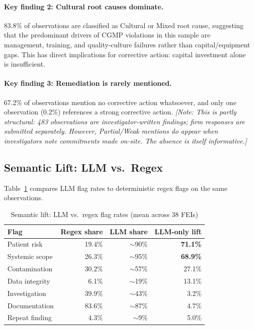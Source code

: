 \documentclass[12pt]{article}
\newcommand{\note}[1]{{\color{blue}\textit{[Note: #1]}}}
\begin{document}
\paragraph{Key finding 2: Cultural root causes dominate.}
83.8\% of observations are classified as Cultural or Mixed root cause,
suggesting that the predominant drivers of CGMP violations in this sample
are management, training, and quality-culture failures rather than
capital/equipment gaps.
This has direct implications for corrective action: capital investment alone
is insufficient.

\paragraph{Key finding 3: Remediation is rarely mentioned.}
67.2\% of observations mention no corrective action whatsoever, and only
one observation (0.2\%) references a strong corrective action.
\note{This is partly structural: 483 observations are investigator-written
findings; firm responses are submitted separately.
However, Partial/Weak mentions do appear when investigators note commitments
made on-site. The absence is itself informative.}

\subsection{Semantic Lift: LLM vs.\ Regex}

Table~\ref{tab:lift} compares LLM flag rates to deterministic regex flags
on the same observations.

\begin{table}[h!]
\centering
\caption{Semantic lift: LLM vs.\ regex flag rates (mean across 38 FEIs)}
\label{tab:lift}
\begin{tabular}{lrrr}
\toprule
\textbf{Flag} & \textbf{Regex share} & \textbf{LLM share}
              & \textbf{LLM-only lift} \\
\midrule
Patient risk   & 19.4\% & $\sim$90\% & \textbf{71.1\%} \\
Systemic scope & 26.3\% & $\sim$95\% & \textbf{68.9\%} \\
Contamination  & 30.2\% & $\sim$57\% & 27.1\% \\
Data integrity &  6.1\% & $\sim$19\% & 13.1\% \\
Investigation  & 39.9\% & $\sim$43\% &  3.2\% \\
Documentation  & 83.6\% & $\sim$87\% &  4.7\% \\
Repeat finding &  4.3\% & $\sim$9\%  &  5.0\% \\
\bottomrule
\end{tabular}
\end{table}
\end{document}
